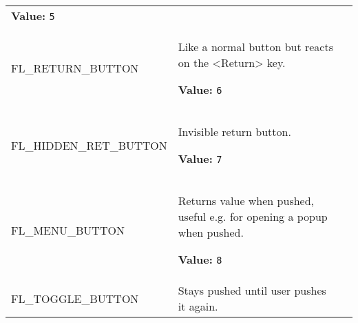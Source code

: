 \begin{longtable}{|p{\varnamewidth}|p{\vardescrwidth}|l}
\textbf{Value:} 
{\tt 5}&\\
\cline{1-2}
\raggedright F\-L\-\_\-R\-E\-T\-U\-R\-N\-\_\-B\-U\-T\-T\-O\-N\- & \raggedright Like a normal button but reacts on the <Return> key.

\textbf{Value:} 
{\tt 6}&\\
\cline{1-2}
\raggedright F\-L\-\_\-H\-I\-D\-D\-E\-N\-\_\-R\-E\-T\-\_\-B\-U\-T\-T\-O\-N\- & \raggedright Invisible return button.

\textbf{Value:} 
{\tt 7}&\\
\cline{1-2}
\raggedright F\-L\-\_\-M\-E\-N\-U\-\_\-B\-U\-T\-T\-O\-N\- & \raggedright Returns value when pushed, useful e.g. for opening a popup when pushed.

\textbf{Value:} 
{\tt 8}&\\
\cline{1-2}
\raggedright F\-L\-\_\-T\-O\-G\-G\-L\-E\-\_\-B\-U\-T\-T\-O\-N\- & \raggedright Stays pushed until user pushes it again.


\end{longtable}
